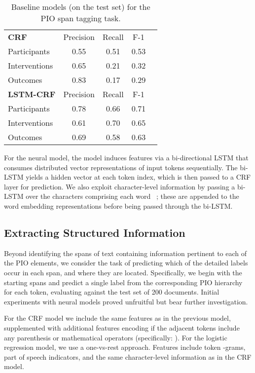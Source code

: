 \documentclass[11pt,a4paper]{article}
\begin{document}
\begin{table}\small
\centering
\begin{tabular}{ l c c c c}
\hline
\bf{CRF} & Precision & Recall & F-1 \\
\cline{2-4}
Participants & 0.55 & 0.51 & 0.53 \\
Interventions & 0.65 & 0.21 & 0.32 \\
Outcomes & 0.83&0.17&0.29\\
\hline
\bf{LSTM-CRF} & Precision & Recall & F-1 \\
\cline{2-4}
Participants & 0.78&0.66&0.71 \\
Interventions & 0.61&0.70&0.65 \\
Outcomes & 0.69&0.58&0.63 \\
\hline
\end{tabular}
\caption{Baseline models (on the test set) for the PIO span tagging task.}
\end{table}
For the neural model, the model induces features via a bi-directional LSTM that consumes distributed vector representations of input tokens sequentially. The bi-LSTM yields a hidden vector at each token index, which is then passed to a CRF layer for prediction. We also exploit character-level information by passing a bi-LSTM over the characters comprising each word ~\cite{lample2016neural}; these are appended to the word embedding representations before being passed through the bi-LSTM. 









\subsection{Extracting Structured Information}
\label{section:tasks-extraction}


Beyond identifying the spans of text containing information pertinent to each of the PIO elements, we consider the task of predicting which of the detailed labels occur in each span, and where they are located.
Specifically, we begin with the starting spans and predict a single label from the corresponding PIO hierarchy for each token, evaluating against the test set of 200 documents.
Initial experiments with neural models proved unfruitful but bear further investigation.

For the CRF model we include the same features as in the previous model, supplemented with additional features encoding if the adjacent tokens include any parenthesis or mathematical operators (specifically: ).
For the logistic regression model, we use a one-vs-rest approach.
Features include token -grams, part of speech indicators, and the same character-level information as in the CRF model. 
\end{document}
